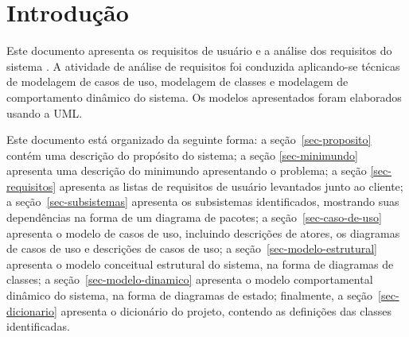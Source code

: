 \chapter{Introdução}
\label{sec-intro}


Este documento apresenta os requisitos de usuário e a análise dos requisitos do sistema \imprimirtitulo. A atividade de análise de requisitos foi conduzida aplicando-se técnicas de modelagem de casos de uso, modelagem de classes e modelagem de comportamento dinâmico do sistema. Os modelos apresentados foram elaborados usando a UML.


Este documento está organizado da seguinte forma: a seção~\ref{sec-proposito} contém uma descrição do propósito do sistema; a seção \ref{sec-minimundo} apresenta uma descrição do minimundo apresentando o problema; a seção \ref{sec-requisitos} apresenta as listas de requisitos de usuário levantados junto ao cliente; a seção~\ref{sec-subsistemas} apresenta os subsistemas identificados, mostrando suas dependências na forma de um diagrama de pacotes; a seção~\ref{sec-caso-de-uso} apresenta o modelo de casos de uso, incluindo descrições de atores, os diagramas de casos de uso e descrições de casos de uso; a seção~\ref{sec-modelo-estrutural} apresenta o modelo conceitual estrutural do sistema, na forma de diagramas de classes; a seção~\ref{sec-modelo-dinamico} apresenta o modelo comportamental dinâmico do sistema, na forma de diagramas de estado; finalmente, a seção~\ref{sec-dicionario} apresenta o  dicionário do projeto, contendo as definições das classes identificadas.